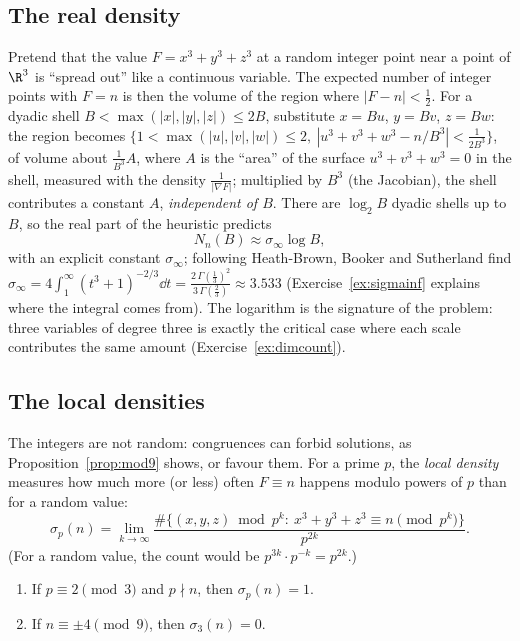 \subsection*{The real density}

Pretend that the value $F=x^3+y^3+z^3$ at a random integer point near a point of $\R^3$ is ``spread out'' like a continuous variable. The expected number of integer points with $F=n$ is then the
volume of the region where $|F-n|<\frac12$. For a dyadic shell $B<\max(|x|,|y|,|z|)\le2B$, substitute $x=Bu$, $y=Bv$, $z=Bw$: the region becomes $\{1<\max(|u|,|v|,|w|)\le2,\ |u^3+v^3+w^3-n/B^3|<\frac1{2B^3}\}$, of
volume about $\frac1{B^3}A$, where $A$ is the ``area'' of the surface $u^3+v^3+w^3=0$ in the shell, measured with the density $\frac1{|\nabla F|}$; multiplied by $B^3$ (the Jacobian), the shell
contributes a constant $A$, \emph{independent of $B$}. There are $\log_2B$ dyadic shells up to $B$, so the real part of the heuristic predicts
\[
N_n(B)\approx\sigma_\infty\log B,
\]
with an explicit constant $\sigma_\infty$; following Heath-Brown, Booker and Sutherland find $\sigma_\infty=4\int_1^\infty(t^3+1)^{-2/3}\dd t=\frac{2\,\Gamma(\frac13)^2}{3\,\Gamma(\frac23)}\approx3.533$ (Exercise~\ref{ex:sigmainf} explains where the integral comes from). The logarithm is the
signature of the problem: three variables of degree three is exactly the critical case where each scale contributes the same amount (Exercise~\ref{ex:dimcount}).

\subsection*{The local densities}

The integers are not random: congruences can forbid solutions, as Proposition~\ref{prop:mod9} shows, or favour them. For a prime $p$, the \emph{local density} measures how much more (or less) often
$F\equiv n$ happens modulo powers of $p$ than for a random value:
\[
\sigma_p(n)=\lim_{k\to\infty}\frac{\#\{(x,y,z)\bmod p^k:\ x^3+y^3+z^3\equiv n\pmod{p^k}\}}{p^{2k}}.
\]
(For a random value, the count would be $p^{3k}\cdot p^{-k}=p^{2k}$.)

\begin{proposition}\label{prop:localdens}
\begin{enumerate}[label=(\alph*)]
\item If $p\equiv2\pmod3$ and $p\nmid n$, then $\sigma_p(n)=1$.
\item If $n\equiv\pm4\pmod9$, then $\sigma_3(n)=0$.
\end{enumerate}
\end{proposition}

